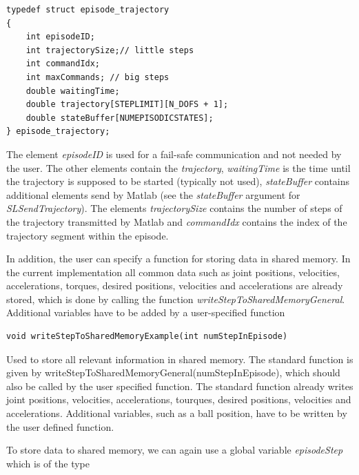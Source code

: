 \documentclass[11pt, article, colorback]{article}
\begin{document}
\begin{lstlisting}
typedef struct episode_trajectory
{
	int episodeID;
	int trajectorySize;// little steps
	int commandIdx;
	int maxCommands; // big steps
	double waitingTime;
	double trajectory[STEPLIMIT][N_DOFS + 1];
	double stateBuffer[NUMEPISODICSTATES];
} episode_trajectory;
\end{lstlisting}
The element {\em episodeID} is used for a fail-safe communication and not needed by the user. The other elements contain the {\em trajectory}, {\em waitingTime} is the time until
the trajectory is supposed to be started (typically not used), {\em stateBuffer} contains additional elements send by Matlab (see the {\em stateBuffer} argument for {\em SLSendTrajectory}).
The elements {\em trajectorySize} contains the number of steps of the trajectory transmitted by Matlab and {\em commandIdx} contains the index of the trajectory segment within the episode. 

In addition, the user can specify a function for storing data in shared memory. In the current implementation all common data such as 
joint positions, velocities, accelerations, torques, desired positions, velocities and accelerations are already stored, which is done by calling the 
function {\em writeStepToSharedMemoryGeneral}. Additional variables have to be added by a user-specified function
\begin{lstlisting}
void writeStepToSharedMemoryExample(int numStepInEpisode)
\end{lstlisting}
Used to store all relevant information in shared memory. The standard function is given by 
writeStepToSharedMemoryGeneral(numStepInEpisode), which should also be called by the user specified function.
The standard function already writes joint positions, velocities, accelerations, tourques, desired positions, velocities and accelerations.
Additional variables, such as a ball position, have to be written by the user defined function. 

To store data to shared memory, we can again use a global variable {\em episodeStep} which is of the type 
\end{document}
